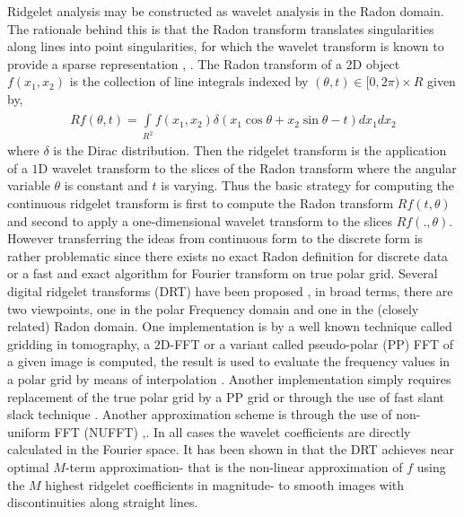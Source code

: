 \documentclass{UCF_ETD}
\begin{document}
Ridgelet analysis may be constructed as wavelet analysis in the Radon domain. The rationale behind this is that the Radon transform translates singularities along lines
into point singularities, for which the wavelet transform is known to provide a sparse representation \cite{Donoho2003}, \cite{Fadili2012}. The Radon transform of a 2D object $f(x_1,x_2)$ is the collection of line integrals indexed by $(\theta, t) \in [0,2\pi) \times R$ given by, 
\begin{eqnarray}
Rf(\theta,t)= \int\limits_{R^2}^{} f(x_1,x_2)\delta(x_1\cos \theta + x_2 \sin \theta - t)dx_1 dx_2
\end{eqnarray}
where $\delta$ is the Dirac distribution. Then the ridgelet transform is the application of a $1$D wavelet transform to the slices of the Radon transform where the angular variable $\theta$ is constant and $t$ is varying. Thus the basic strategy for computing the continuous ridgelet transform is first to compute the Radon transform $Rf(t,\theta)$ and second to apply a one-dimensional wavelet transform to the slices $Rf(.,\theta)$. However transferring the ideas from continuous form to the discrete form is rather problematic since there exists no exact Radon definition for discrete data or a fast and exact algorithm for Fourier transform on true polar grid. Several digital ridgelet transforms (DRT) have been proposed \cite{Starck2004}, in broad terms, there are two viewpoints, one in the polar Frequency domain and one in the (closely related) Radon domain. One implementation is by a well known technique called gridding in tomography, a $2$D-FFT or a variant called pseudo-polar (PP) FFT of a given image is computed, the result is used to evaluate the frequency values in a polar grid by means of interpolation \cite{Amir2006}. Another implementation simply requires replacement of the true polar grid by a PP grid \cite{Amir2006} or through the use of fast slant slack technique \cite{Amir2001}. Another approximation scheme is through the use of non-uniform FFT (NUFFT) \cite{Markus2007},\cite{Keiner2009}. In all cases the wavelet coefficients are directly calculated in the Fourier space. It has been shown in \cite{CandesRoyal1999} that the DRT achieves near optimal $M$-term approximation- that is the non-linear approximation of $f$ using the $M$ highest ridgelet coefficients in magnitude- to smooth images with discontinuities along straight lines.
\end{document}
